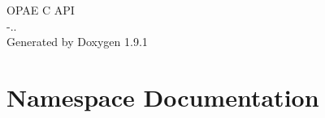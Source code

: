 \let\mypdfximage\pdfximage\def\pdfximage{\immediate\mypdfximage}\documentclass[twoside]{book}
\newcommand{\+}{\discretionary{\mbox{\scriptsize$\hookleftarrow$}}{}{}}
\newcommand{\clearemptydoublepage}{%
  \newpage{\pagestyle{empty}\cleardoublepage}%
}
\begin{document}
\raggedbottom

\begin{titlepage}
\vspace*{7cm}
\begin{center}%
{\Large OPAE C API \\[1ex]\large -\/.. }\\
\vspace*{1cm}
{\large Generated by Doxygen 1.9.1}\\
\end{center}
\end{titlepage}
\clearemptydoublepage
{}
\tableofcontents
\clearemptydoublepage
{}

\chapter{Namespace Documentation}









\end{document}
